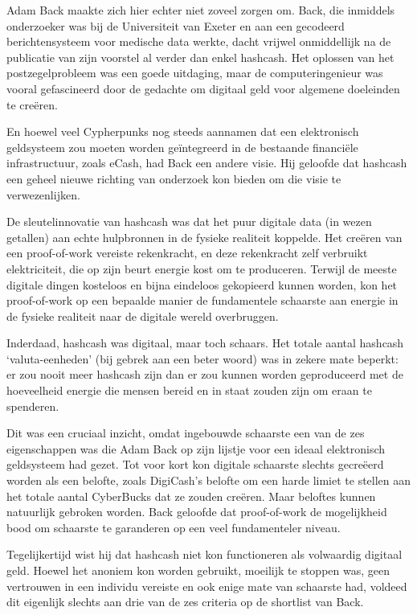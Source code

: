 \documentclass[
  a5paper,
  smalldemyvopaper,11pt,twoside,onecolumn,openright,extrafontsizes]{memoir}
\begin{document}
Adam Back maakte zich hier echter niet zoveel zorgen om. Back, die
inmiddels onderzoeker was bij de Universiteit van Exeter en aan een
gecodeerd berichtensysteem voor medische data werkte, dacht vrijwel
onmiddellijk na de publicatie van zijn voorstel al verder dan enkel
hashcash. Het oplossen van het postzegelprobleem was een goede
uitdaging, maar de computeringenieur was vooral gefascineerd door de
gedachte om digitaal geld voor algemene doeleinden te creëren.

En hoewel veel Cypherpunks nog steeds aannamen dat een elektronisch
geldsysteem zou moeten worden geïntegreerd in de bestaande financiële
infrastructuur, zoals eCash, had Back een andere visie. Hij geloofde dat
hashcash een geheel nieuwe richting van onderzoek kon bieden om die
visie te verwezenlijken.

De sleutelinnovatie van hashcash was dat het puur digitale data (in
wezen getallen) aan echte hulpbronnen in de fysieke realiteit koppelde.
Het creëren van een proof-of-work vereiste rekenkracht, en deze
rekenkracht zelf verbruikt elektriciteit, die op zijn beurt energie kost
om te produceren. Terwijl de meeste digitale dingen kosteloos en bijna
eindeloos gekopieerd kunnen worden, kon het proof-of-work op een
bepaalde manier de fundamentele schaarste aan energie in de fysieke
realiteit naar de digitale wereld overbruggen.

Inderdaad, hashcash was digitaal, maar toch schaars. Het totale aantal
hashcash `valuta-eenheden' (bij gebrek aan een beter woord) was in
zekere mate beperkt: er zou nooit meer hashcash zijn dan er zou kunnen
worden geproduceerd met de hoeveelheid energie die mensen bereid en in
staat zouden zijn om eraan te spenderen.

Dit was een cruciaal inzicht, omdat ingebouwde schaarste een van de zes
eigenschappen was die Adam Back op zijn lijstje voor een ideaal
elektronisch geldsysteem had gezet. Tot voor kort kon digitale schaarste
slechts gecreëerd worden als een belofte, zoals DigiCash's belofte om
een harde limiet te stellen aan het totale aantal CyberBucks dat ze
zouden creëren. Maar beloftes kunnen natuurlijk gebroken worden. Back
geloofde dat proof-of-work de mogelijkheid bood om schaarste te
garanderen op een veel fundamenteler niveau.

Tegelijkertijd wist hij dat hashcash niet kon functioneren als
volwaardig digitaal geld. Hoewel het anoniem kon worden gebruikt,
moeilijk te stoppen was, geen vertrouwen in een individu vereiste en ook
enige mate van schaarste had, voldeed dit eigenlijk slechts aan drie van
de zes criteria op de shortlist van Back.
\end{document}

